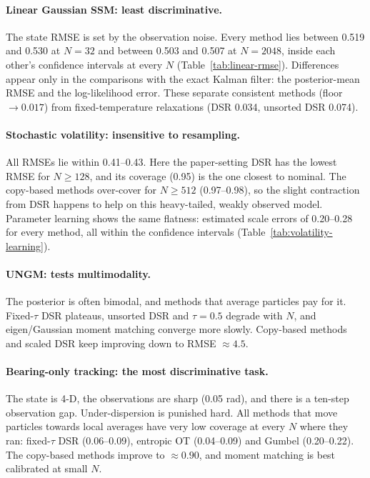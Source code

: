 \paragraph{Linear Gaussian SSM: least discriminative.}
The state RMSE is set by the observation noise. Every method lies between 0.519 and 0.530 at $N{=}32$ and between 0.503 and 0.507 at $N{=}2048$, inside each other's confidence intervals at every $N$ (Table~\ref{tab:linear-rmse}). Differences appear only in the comparisons with the exact Kalman filter: the posterior-mean RMSE and the log-likelihood error. These separate consistent methods (floor $\to0.017$) from fixed-temperature relaxations (DSR 0.034, unsorted DSR 0.074).

\paragraph{Stochastic volatility: insensitive to resampling.}
All RMSEs lie within 0.41--0.43. Here the paper-setting DSR has the lowest RMSE for $N\ge128$, and its coverage (0.95) is the one closest to nominal. The copy-based methods over-cover for $N\ge512$ (0.97--0.98), so the slight contraction from DSR happens to help on this heavy-tailed, weakly observed model. Parameter learning shows the same flatness: estimated scale errors of 0.20--0.28 for every method, all within the confidence intervals (Table~\ref{tab:volatility-learning}).

\paragraph{UNGM: tests multimodality.}
The posterior is often bimodal, and methods that average particles pay for it. Fixed-$\tau$ DSR plateaus, unsorted DSR and $\tau{=}0.5$ degrade with $N$, and eigen/Gaussian moment matching converge more slowly. Copy-based methods and scaled DSR keep improving down to RMSE $\approx4.5$.

\paragraph{Bearing-only tracking: the most discriminative task.}
The state is 4-D, the observations are sharp (0.05 rad), and there is a ten-step observation gap. Under-dispersion is punished hard. All methods that move particles towards local averages have very low coverage at every $N$ where they ran: fixed-$\tau$ DSR (0.06--0.09), entropic OT (0.04--0.09) and Gumbel (0.20--0.22). The copy-based methods improve to $\approx0.90$, and moment matching is best calibrated at small $N$.

